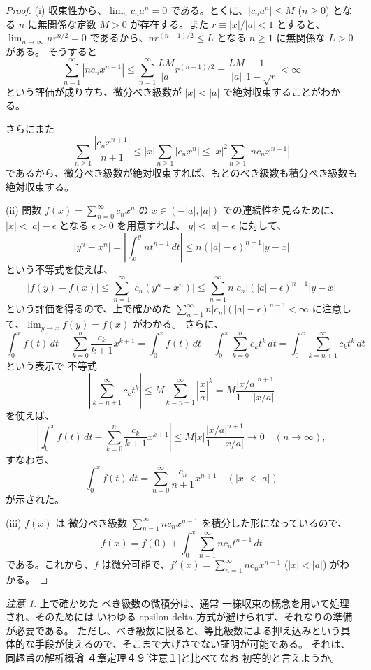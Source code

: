 \documentclass[a4paper]{jsarticle}
\theoremstyle{definition}
\theoremstyle{remark}
\newtheorem{Remark}{注意}
\begin{document}
\begin{proof}
(i) 収束性から、$\lim_n c_n a^n = 0$ である。とくに、$|c_na^n| \leq M$ ($n \geq 0$) となる
$n$ に無関係な定数 $M>0$ が存在する。また $r \equiv |x|/|a| < 1$ とすると、
$\lim_{n \to \infty} n r^{n/2} = 0$ であるから、$n r^{(n-1)/2} \leq L$ となる $n \geq 1$ に無関係な $L > 0$ がある。
そうすると
\[
  \sum_{n=1}^\infty |nc_n x^{n-1}| \leq \sum_{n=1}^\infty \frac{LM}{|a|} r^{(n-1)/2} = \frac{LM}{|a|} \frac{1}{1- \sqrt{r}} < \infty
\]
という評価が成り立ち、微分べき級数が $|x| < |a|$ で絶対収束することがわかる。

さらにまた
\[
 \sum_{n \geq 1} \frac{|c_nx^{n+1}|}{n+1} \leq |x| \sum_{n \geq 1} |c_nx^n| \leq |x|^2 \sum_{n\geq 1} |nc_n x^{n-1}| 
\]
であるから、微分べき級数が絶対収束すれば、もとのべき級数も積分べき級数も絶対収束する。

(ii) 
関数 $f(x) = \sum_{n=0}^\infty c_n x^n$ の $x \in (-|a|,|a|)$ での連続性を見るために、
$|x| < |a| - \epsilon$ となる $\epsilon >0$ を用意すれば、$|y| < |a| - \epsilon$ に対して、
\[
  |y^n - x^n| = \left| \int_x^y n t^{n-1}\, dt \right| \leq n (|a| - \epsilon)^{n-1} |y-x|
\]
という不等式を使えば、
\[
  |f(y) - f(x)| \leq \sum_{n=1}^\infty |c_n(y^n - x^n)|
  \leq \sum_{n=1}^\infty n|c_n| (|a| - \epsilon)^{n-1} |y-x|
\]
という評価を得るので、上で確かめた $\sum_{n=1}^\infty n|c_n|(|a| - \epsilon)^{n-1} < \infty$ に注意して、$\lim_{y \to x} f(y) = f(x)$ がわかる。
さらに、
\[
  \int_0^x f(t)\, dt - \sum_{k=0}^n \frac{c_k}{k+1} x^{k+1} = \int_0^x f(t)\, dt - \int_0^x \sum_{k=0}^n c_k t^k\, dt
  = \int_0^x \sum_{k=n+1}^\infty c_k t^k\, dt
\]
という表示で 不等式
\[
\left| \sum_{k=n+1}^\infty c_k t^k \right| \leq M \sum_{k=n+1}^\infty \left|\frac{x}{a} \right|^k
= M \frac{|x/a|^{n+1}}{1 - |x/a|}
\]
を使えば、
\[
  \left|  \int_0^x f(t)\, dt - \sum_{k=0}^n \frac{c_k}{k+1} x^{k+1} \right| \leq
  M |x| \frac{|x/a|^{n+1}}{1 - |x/a|} \to 0
    \quad
    (n \to \infty), 
  \]
  すなわち、
  \[
    \int_0^x f(t)\, dt = \sum_{n=0}^\infty \frac{c_n}{n+1} x^{n+1}
    \quad
    (|x| < |a|)
  \]
が示された。

(iii) $f(x)$ は 微分べき級数 $\sum_{n=1}^\infty nc_n x^{n-1}$ を積分した形になっているので、
\[
  f(x) = f(0) + \int_0^x \sum_{n=1}^\infty nc_n t^{n-1}\, dt
\]
である。これから、$f$ は微分可能で、$f'(x) = \sum_{n=1}^\infty nc_n x^{n-1}$ ($|x| < |a|$) がわかる。
\end{proof}

\begin{Remark}
  {\small
  上で確かめた べき級数の微積分は、通常 一様収束の概念を用いて処理され、そのためには いわゆる epsilon-delta 方式が避けられず、それなりの準備が必要である。
  ただし、べき級数に限ると、等比級数による押え込みという具体的な手段が使えるので、そこまで大げさでない証明が可能である。
  それは、同趣旨の解析概論 ４章定理４９[注意１]と比べてなお 初等的と言えようか。}
\end{Remark}
\end{document}
